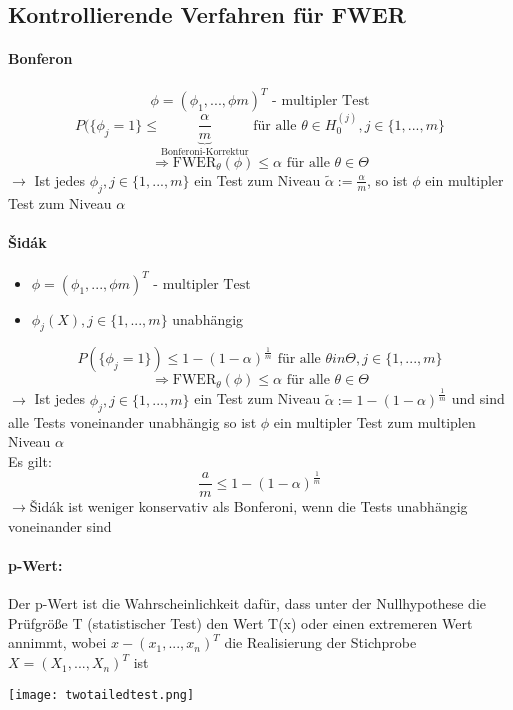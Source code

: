 \subsection{Kontrollierende Verfahren für FWER}
\paragraph{Bonferon}
\[ \phi = (\phi_{1},...,\phi{m})^T \text{  - multipler Test} \]
\[ P(\{\phi_j = 1\} \leq \underbrace{\frac{\alpha}{m}}_{\text{Bonferoni-Korrektur}} \text{ für alle } \theta \in H_0^{(j)}, j \in \{1,...,m\} \]
\[ \Rightarrow \text{FWER}_{\theta}(\phi) \leq \alpha \text{ für alle }\theta \in \Theta \]
$\rightarrow$ Ist jedes $\phi_j, j \in \{1,...,m\}$ ein Test zum Niveau $\tilde{\alpha} := \frac{\alpha}{m}$, so ist $\phi$ ein multipler Test zum Niveau $\alpha$

\paragraph{\v Sid\'ak}
\begin{itemize}
 \item $ \phi = (\phi_{1},...,\phi{m})^T \text{  - multipler Test} $
 \item $\phi_j (X), j \in \{1,...,m \}$ unabhängig
\end{itemize}
\[ P(\{\phi_j = 1\} ) \leq 1-(1-\alpha)^{\frac{1}{m}} \text{ für alle } \theta in \Theta, j \in \{1,...,m\}\]
\[ \Rightarrow \text{FWER}_{\theta}(\phi) \leq \alpha \text{ für alle }\theta \in \Theta \]
$\rightarrow$ Ist jedes $\phi_j, j \in \{1,...,m\}$ ein Test zum Niveau $\tilde{\alpha} := 1-(1-\alpha)^{\frac{1}{m}}$ und sind alle Tests voneinander unabhängig so ist $\phi$ ein multipler Test zum multiplen Niveau $\alpha$ \\
Es gilt:
\[ \frac{a}{m} \leq 1-(1-\alpha)^{\frac{1}{m}} \]
$\rightarrow$\v Sid\'ak ist weniger konservativ als Bonferoni, wenn die Tests unabhängig voneinander sind \\

\paragraph{p-Wert:}
Der p-Wert ist die Wahrscheinlichkeit dafür, dass unter der Nullhypothese die Prüfgröße T (statistischer Test) den Wert T(x) oder einen extremeren Wert annimmt, wobei $x-(x_1,...,x_n)^T$ die Realisierung der Stichprobe $X=(X_1,...,X_n)^T$ ist
\begin{center}
\texttt{[image: twotailedtest.png]}
\end{center}

